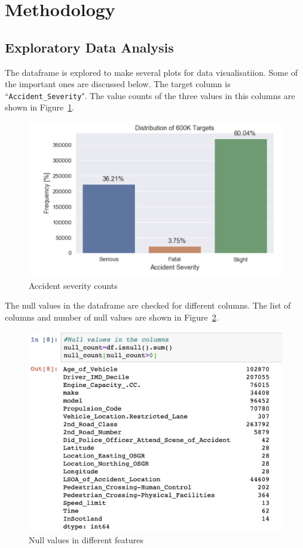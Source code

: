 \documentclass[12pt]{article}
\begin{document}
\section{Methodology}
\subsection{Exploratory Data Analysis}
The dataframe is explored to make several plots for data visualisatiion. Some of the important ones are discussed below. 
The target column is ``\verb|Accident_Severity|". The value counts of the three values in this columns are shown in Figure~\ref{fig2}.
\begin{figure}[h!]
\centering
\includegraphics[width=0.8\linewidth]{"./figs/fig2"}
\caption{Accident severity counts}
\label{fig2}
\end{figure}
The null values in the dataframe are checked for different columns. The list of columns and number of null values are shown in Figure~\ref{fig3}.
\begin{figure}[h!]
\centering
\includegraphics[width=0.8\linewidth]{"./figs/fig3"}
\caption{Null values in different features}
\label{fig3}
\end{figure}
\end{document}
